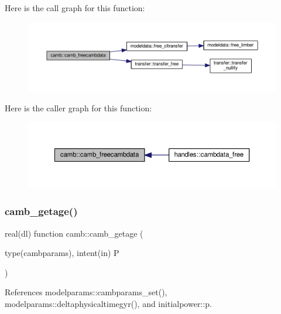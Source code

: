 Here is the call graph for this function\+:
\nopagebreak
\begin{figure}[H]
\begin{center}
\leavevmode
\includegraphics[width=350pt]{namespacecamb_a20b57e6f6098c5800cbf374d96307d13_cgraph}
\end{center}
\end{figure}
Here is the caller graph for this function\+:
\nopagebreak
\begin{figure}[H]
\begin{center}
\leavevmode
\includegraphics[width=350pt]{namespacecamb_a20b57e6f6098c5800cbf374d96307d13_icgraph}
\end{center}
\end{figure}
\mbox{\label{namespacecamb_a53e4d3ff396030bd7e41d606cfa458b2}} 
\subsubsection{\texorpdfstring{camb\+\_\+getage()}{camb\_getage()}}
{\footnotesize\ttfamily real(dl) function camb\+::camb\+\_\+getage (\begin{DoxyParamCaption}\item[{type(cambparams), intent(in)}]{P }\end{DoxyParamCaption})}



References modelparams\+::cambparams\+\_\+set(), modelparams\+::deltaphysicaltimegyr(), and initialpower\+::p.

